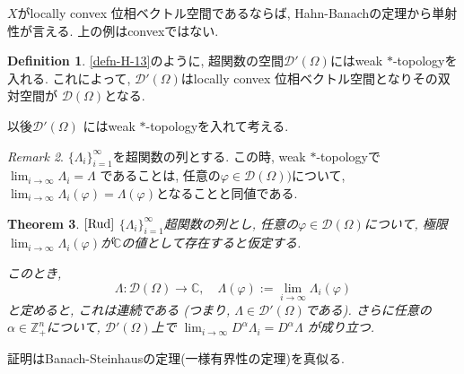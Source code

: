 \documentclass[dvipdfmx,a4paper,11pt]{article} %
\newtheorem{thm}{Theorem}[section]
\theoremstyle{definition}
\newtheorem{defn}[thm]{Definition}
\theoremstyle{remark}
\newtheorem{rem}[thm]{Remark}
\numberwithin{equation}{section}
\newcommand{\N}{\mathbb{Z}_+}
\newcommand{\C}{\mathbb{C}}
\begin{document}
$X$がlocally convex 位相ベクトル空間であるならば, Hahn-Banachの定理から単射性が言える. 上の例はconvexではない. 

\begin{tcolorbox}[mybox]
\begin{defn}{\cite[6.16]{Rud}}
\label{defn-H-14}
\ref{defn-H-13}のように, 超関数の空間\(\mathcal{D}'(\Omega)\)にはweak \( * \)-topologyを入れる. 
これによって,  \(\mathcal{D}'(\Omega)\)はlocally convex 位相ベクトル空間となりその双対空間が \(\mathcal{D}(\Omega)\)となる. 
\end{defn}
\end{tcolorbox}
以後\(\mathcal{D}'(\Omega)\) にはweak \( * \)-topologyを入れて考える.



\begin{rem}{\cite[6.16]{Rud}}
\label{rem-H-15} %
\(\{\Lambda_i\}_{i=1}^\infty\)を超関数の列とする. 
この時, weak \( * \)-topologyで\(\displaystyle \lim_{i \to \infty} \Lambda_i = \Lambda\) であることは, 
任意の$\varphi \in \mathcal{D}(\Omega))$について, \(\lim_{i \to \infty} \Lambda_i(\varphi) = \Lambda(\varphi)
\)となることと同値である. 
\end{rem}



\begin{tcolorbox}[mybox]
\begin{thm}{$\cite[Thm 6.17]{Rud}$}
\label{thm-H-16}
$\{\Lambda_i\}_{i=1}^\infty$超関数の列とし, 
任意の$\varphi \in \mathcal{D}(\Omega)$について, 
極限\(\lim_{i \to \infty} \Lambda_i(\varphi) \)が$\C$の値として存在すると仮定する.

このとき, \[
\Lambda : \mathcal{D}(\Omega) \to \mathbb{C}, \quad \Lambda(\varphi) := \lim_{i \to \infty} \Lambda_i(\varphi)
\]
と定めると, これは連続である (つまり, $\Lambda \in \mathcal{D}'(\Omega)$である).
さらに任意の$\alpha \in \N^n$について, $\mathcal{D}'(\Omega)$上で
\(\lim_{i \to \infty} D^\alpha \Lambda_i = D^\alpha \Lambda\)
が成り立つ. 
\end{thm}
\end{tcolorbox}
証明はBanach-Steinhausの定理(一様有界性の定理)を真似る.
\end{document}
